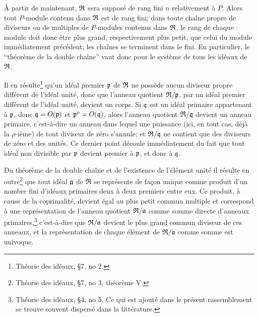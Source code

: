 À partir de maintenant, $\mathfrak R$ sera supposé de rang fini $n$ relativement à $P$. Alors tout $P$-module contenu dans $\mathfrak R$ est de rang fini; dans toute chaîne propre de diviseurs ou de multiples de $P$-modules contenus dans $\mathfrak R$, le rang de chaque module doit donc être plus grand, respectivement plus petit, que celui du module immédiatement précédent; les chaînes se terminent dans le fini. En particulier, le ``théorème de la double chaîne'' vaut donc pour le système de tous les idéaux de $\mathfrak R$.

Il en résulte\footnote{Théorie des idéaux, \S 7, no 2.} qu'un idéal premier $\mathfrak p$ de $\mathfrak R$ ne possède aucun diviseur propre différent de l'idéal unité, donc que l'anneau quotient $\mathfrak R/\mathfrak p$, par un idéal premier différent de l'idéal unité, devient un corps. Si $\mathfrak q$ est un idéal primaire appartenant à $\mathfrak p$, donc $\mathfrak q=O(\mathfrak p)$ et $\mathfrak p^{\rho}=O(\mathfrak q)$, alors l'anneau quotient $\mathfrak R/\mathfrak q$ devient un anneau primaire, c'est-à-dire un anneau dans lequel une puissance (ici, en tout cas, déjà la $\rho$-ième) de tout diviseur de zéro s'annule; et $\mathfrak R/\mathfrak q$ ne contient que des diviseurs de zéro et des unités. Ce dernier point découle immédiatement du fait que tout idéal non divisible par $\mathfrak p$ devient premier à $\mathfrak p$, et donc à $\mathfrak q$.

Du théorème de la double chaîne et de l'existence de l'élément unité il résulte en outre\footnote{Théorie des idéaux, \S 7, no 3, théorème V.} que tout idéal $\mathfrak a$ de $\mathfrak R$ se représente de façon unique comme produit d'un nombre fini d'idéaux primaires deux à deux premiers entre eux. Ce produit, à cause de la coprimalité, devient égal au plus petit commun multiple et correspond à une représentation de l'anneau quotient $\mathfrak R/\mathfrak a$ comme somme directe d'anneaux primaires,\footnote{Théorie des idéaux, \S 4, no 5. Ce qui est ajouté dans le présent rassemblement se trouve souvent dispersé dans la littérature.} c'est-à-dire que $\mathfrak R/\mathfrak a$ devient le plus grand commun diviseur de ces anneaux, et la représentation de chaque élément de $\mathfrak R/\mathfrak a$ comme somme est univoque.

